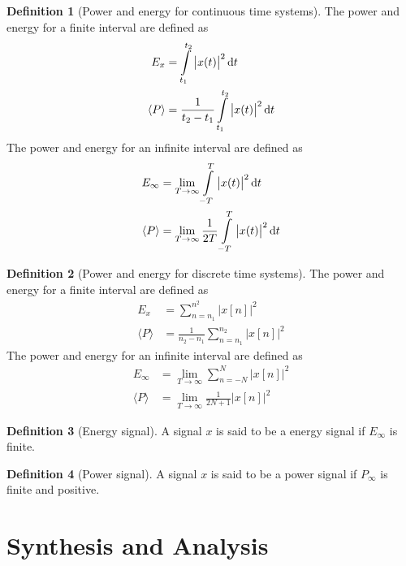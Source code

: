 \documentclass[titlepage, fleqn, a4paper, 12pt, twoside]{article}
\theoremstyle{definition}
\newtheorem{definition}{Definition}
\theoremstyle{theorem}
\begin{document}
\begin{definition}[Power and energy for continuous time systems]
	The power and energy for a finite interval are defined as
	\begin{align*}
		E_x &= \int\limits_{t_1}^{t_2} \left| x(t) \right|^2 \dif t\\
		\langle P \rangle &= \frac{1}{t_2 - t_1} \int\limits_{t_1}^{t_2} \left| x(t) \right|^2 \dif t
	\end{align*}
	The power and energy for an infinite interval are defined as
	\begin{align*}
		E_{\infty} &= \lim\limits_{T \to \infty} \int\limits_{-T}^{T} \left| x(t) \right|^2 \dif t\\
		\langle P \rangle &= \lim\limits_{T \to \infty} \frac{1}{2 T} \int\limits_{-T}^{T} \left| x(t) \right|^2 \dif t
	\end{align*}
\end{definition}

\begin{definition}[Power and energy for discrete time systems]
	The power and energy for a finite interval are defined as
	\begin{align*}
		E_x &= \sum\limits_{n = n_1}^{n^2} \left| x[n] \right|^2\\
		\langle P \rangle &= \frac{1}{n_2 - n_1} \sum\limits_{n = n_1}^{n_2} \left| x[n] \right|^2
	\end{align*}
	The power and energy for an infinite interval are defined as
	\begin{align*}
		E_{\infty} &= \lim\limits_{T \to \infty} \sum\limits_{n = -N}^{N} \left| x[n] \right|^2\\
		\langle P \rangle &= \lim\limits_{T \to \infty} \frac{1}{2 N + 1} \left| x[n] \right|^2
	\end{align*}
\end{definition}

\begin{definition}[Energy signal]
	A signal $x$ is said to be a energy signal if $E_{\infty}$ is finite.
\end{definition}

\begin{definition}[Power signal]
	A signal $x$ is said to be a power signal if $P_{\infty}$ is finite and positive.
\end{definition}

\section{Synthesis and Analysis}
\end{document}
